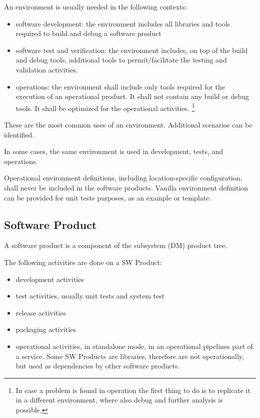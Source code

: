 An environment is usually needed in the following contexts:

\begin{itemize}
\item software development: the environment includes all libraries and tools required to build and debug a software product
\item software test and verification: the environment includes, on top of the build and debug tools, additional tools to permit/facilitate the testing and validation activities.
\item operations: the environment shall include only tools required for the execution of an operational product. It shall not contain any build or debug tools. It shall be optimized for the operational activities. \footnote{In case a problem is found in operation the first thing to do is to replicate it in a different environment, where also debug and further analysis is possible.}
\end{itemize}

These are the most common uses of an environment. Additional scenarios can be identified.

In some cases, the same environment is used in development, tests, and operations.

Operational environment definitions, including location-specific configuration, shall never be included in the software products.
Vanilla environment definition can be provided for unit tests purposes, as an example or template.


\subsection{Software Product} \label{sec:swprod}

A software product is a component of the subsystem (DM) product tree.

The following activities are done on a SW Product:
\begin{itemize}
\item development activities
\item test activities, usually unit tests and system test
\item release activities
\item packaging activities
\item operational activities, in standalone mode, in an operational pipelines part of a service. Some SW Products are libraries, therefore are not operationally, but used as dependencies by other software products.
\end{itemize}


